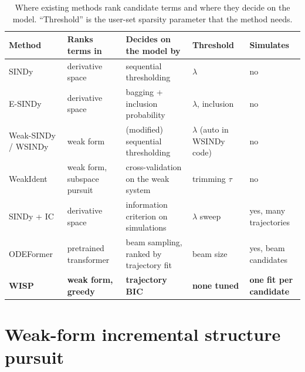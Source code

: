 \documentclass[10pt]{article}
\begin{document}
\begin{table}[t]
\centering\small
\caption{Where existing methods rank candidate terms and where they decide on the model. ``Threshold'' is the
user-set sparsity parameter that the method needs.}
\label{tab:positioning}
\setlength{\tabcolsep}{4pt}
\begin{tabularx}{\textwidth}{@{}>{\raggedright}p{29mm}>{\raggedright}p{23mm}>{\raggedright}X>{\raggedright}p{24mm}>{\raggedright\arraybackslash}p{24mm}@{}}
\toprule
Method & Ranks terms in & Decides on the model by & Threshold & Simulates \\
\midrule
SINDy \cite{brunton2016} & derivative space & sequential thresholding & $\lambda$ & no \\
E-SINDy \cite{fasel2022} & derivative space & bagging + inclusion probability & $\lambda$, inclusion & no \\
Weak-SINDy / WSINDy \cite{messenger2021mms,messenger2021jcp} & weak form & (modified) sequential thresholding & $\lambda$ (auto in WSINDy code) & no \\
WeakIdent \cite{tang2023} & weak form, subspace pursuit & cross-validation on the weak system & trimming $\tau$ & no \\
SINDy + IC \cite{mangan2017} & derivative space & information criterion on simulations & $\lambda$ sweep & yes, many trajectories \\
ODEFormer \cite{dascoli2024} & pretrained transformer & beam sampling, ranked by trajectory fit & beam size & yes, beam candidates \\
\textbf{WISP} & \textbf{weak form, greedy} & \textbf{trajectory BIC} & \textbf{none tuned} & \textbf{one fit per candidate} \\
\bottomrule
\end{tabularx}
\end{table}

\section{Weak-form incremental structure pursuit}\label{sec:method}
\end{document}
